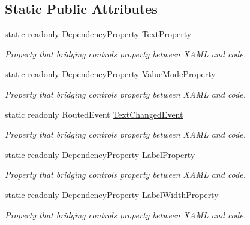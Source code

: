 \subsection*{Static Public Attributes}
\begin{DoxyCompactItemize}
\item 
static readonly Dependency\+Property \mbox{\hyperlink{class_wpf_handler_1_1_u_i_1_1_controls_1_1_text_field_control_a333e66e23a4653713e1a4b27571b7553}{Text\+Property}}
\begin{DoxyCompactList}\small\item\em Property that bridging control\textquotesingle{}s property between X\+A\+ML and code. \end{DoxyCompactList}\item 
static readonly Dependency\+Property \mbox{\hyperlink{class_wpf_handler_1_1_u_i_1_1_controls_1_1_text_field_control_a062dfc30849f6fff2dee9ea75ab272ef}{Value\+Mode\+Property}}
\begin{DoxyCompactList}\small\item\em Property that bridging control\textquotesingle{}s property between X\+A\+ML and code. \end{DoxyCompactList}\item 
static readonly Routed\+Event \mbox{\hyperlink{class_wpf_handler_1_1_u_i_1_1_controls_1_1_text_field_control_af4ec0cb3db2339845ead75a90d0f18ff}{Text\+Changed\+Event}}
\begin{DoxyCompactList}\small\item\em Property that bridging control\textquotesingle{}s property between X\+A\+ML and code. \end{DoxyCompactList}\item 
static readonly Dependency\+Property \mbox{\hyperlink{class_wpf_handler_1_1_u_i_1_1_controls_1_1_text_field_control_acead52c79405215bbfd50ff38fe08145}{Label\+Property}}
\begin{DoxyCompactList}\small\item\em Property that bridging control\textquotesingle{}s property between X\+A\+ML and code. \end{DoxyCompactList}\item 
static readonly Dependency\+Property \mbox{\hyperlink{class_wpf_handler_1_1_u_i_1_1_controls_1_1_text_field_control_a8dbe89b4efe3eb38c82799e8ce68cf2c}{Label\+Width\+Property}}
\begin{DoxyCompactList}\small\item\em Property that bridging control\textquotesingle{}s property between X\+A\+ML and code. \end{DoxyCompactList}\item 

\end{DoxyCompactItemize}
